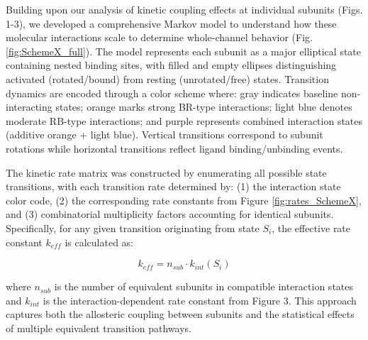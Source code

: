 \documentclass[pdflatex,sn-nature]{sn-jnl}%
\theoremstyle{thmstyleone}%
\theoremstyle{thmstyletwo}%
\theoremstyle{thmstylethree}%
\begin{document}
Building upon our analysis of kinetic coupling effects at individual subunits (Figs. 1-3), we developed a comprehensive Markov model to understand how these molecular interactions scale to determine whole-channel behavior (Fig. \ref{fig:SchemeX_full}). The model represents each subunit as a major elliptical state containing nested binding sites, with filled and empty ellipses distinguishing activated (rotated/bound) from resting (unrotated/free) states. Transition dynamics are encoded through a color scheme where: gray indicates baseline non-interacting states; orange marks strong BR-type interactions; light blue denotes moderate RB-type interactions; and purple represents combined interaction states (additive orange + light blue). Vertical transitions correspond to subunit rotations while horizontal transitions reflect ligand binding/unbinding events.

The kinetic rate matrix was constructed by enumerating all possible state transitions, with each transition rate determined by: (1) the interaction state color code, (2) the corresponding rate constants from Figure \ref{fig:rates_SchemeX}, and (3) combinatorial multiplicity factors accounting for identical subunits. Specifically, for any given transition originating from state $S_i$, the effective rate constant $k_{eff}$ is calculated as:

\begin{equation}
	k_{eff} = n_{sub} \cdot k_{int}(S_i)
\end{equation}

\noindent where $n_{sub}$ is the number of equivalent subunits in compatible interaction states and $k_{int}$ is the interaction-dependent rate constant from Figure 3. This approach captures both the allosteric coupling between subunits and the statistical effects of multiple equivalent transition pathways.
\end{document}
